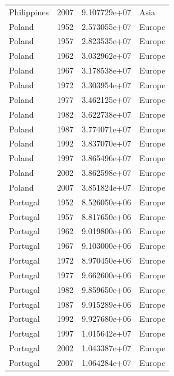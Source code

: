 \documentclass[
  letterpaper,
  DIV=11,
  numbers=noendperiod]{scrreprt}
\begin{document}
\begin{tcolorbox}
\begin{tabular}{lrrl}
Philippines              &  2007 &  9.107729e+07 &      Asia \\
Poland                   &  1952 &  2.573055e+07 &    Europe \\
Poland                   &  1957 &  2.823535e+07 &    Europe \\
Poland                   &  1962 &  3.032962e+07 &    Europe \\
Poland                   &  1967 &  3.178538e+07 &    Europe \\
Poland                   &  1972 &  3.303954e+07 &    Europe \\
Poland                   &  1977 &  3.462125e+07 &    Europe \\
Poland                   &  1982 &  3.622738e+07 &    Europe \\
Poland                   &  1987 &  3.774071e+07 &    Europe \\
Poland                   &  1992 &  3.837070e+07 &    Europe \\
Poland                   &  1997 &  3.865496e+07 &    Europe \\
Poland                   &  2002 &  3.862598e+07 &    Europe \\
Poland                   &  2007 &  3.851824e+07 &    Europe \\
Portugal                 &  1952 &  8.526050e+06 &    Europe \\
Portugal                 &  1957 &  8.817650e+06 &    Europe \\
Portugal                 &  1962 &  9.019800e+06 &    Europe \\
Portugal                 &  1967 &  9.103000e+06 &    Europe \\
Portugal                 &  1972 &  8.970450e+06 &    Europe \\
Portugal                 &  1977 &  9.662600e+06 &    Europe \\
Portugal                 &  1982 &  9.859650e+06 &    Europe \\
Portugal                 &  1987 &  9.915289e+06 &    Europe \\
Portugal                 &  1992 &  9.927680e+06 &    Europe \\
Portugal                 &  1997 &  1.015642e+07 &    Europe \\
Portugal                 &  2002 &  1.043387e+07 &    Europe \\
Portugal                 &  2007 &  1.064284e+07 &    Europe \\

\end{tabular}
\end{tcolorbox}
\end{document}
